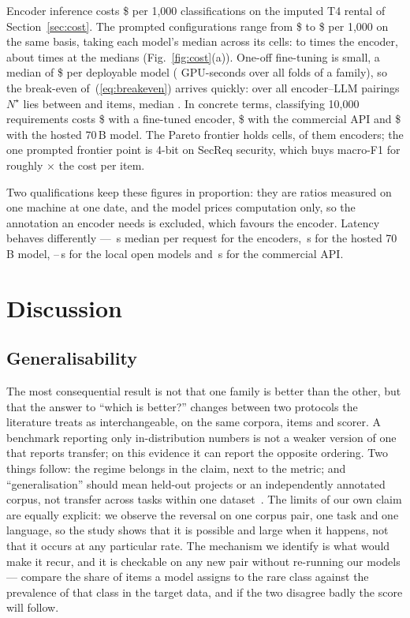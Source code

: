 \documentclass[conference]{IEEEtran}
\newcommand{\Fm}{macro-F1}
\begin{document}
Encoder inference costs \$\nCostEnc{} per 1,000 classifications on the imputed T4
rental of Section~\ref{sec:cost}. The prompted configurations range from
\$\nCostLLMmin{} to \$\nCostLLMmax{} per 1,000 on the same basis, taking each
model's median across its cells: \nRatioMin{} to \nRatioMax{} times the encoder,
about \nRatioMed{} times at the medians (Fig.~\ref{fig:cost}(a)). One-off
fine-tuning is small, a median of \$\nTrainMed{} per deployable model
(\nTrainSec{} GPU-seconds over all folds of a family), so the break-even
of~(\ref{eq:breakeven}) arrives quickly: over all \nNBE{} encoder--LLM pairings
$N^{\star}$ lies between \nBEmin{} and \nBEmax{} items, median \nBEmed{}. In
concrete terms, classifying 10,000 requirements costs \$\nTenkEnc{} with a
fine-tuned encoder, \$\nTenkGem{} with the commercial API and \$\nTenkLla{} with
the hosted 70\,B model. The Pareto frontier holds \nNPareto{} cells,
\nNParetoEnc{} of them encoders; the one prompted frontier point is 4-bit
\nParetoLLM{} on SecReq security, which buys \nParetoGain{} \Fm{} for roughly
\nParetoRatio$\times$ the cost per item.

Two qualifications keep these figures in proportion: they are ratios measured on
one machine at one date, and the model prices computation only, so the annotation
an encoder needs is excluded, which favours the encoder. Latency behaves
differently --- \nLatEnc\,s median per request for the encoders, \nLatHost\,s
for the hosted 70\,B model, \nLatLocMin--\nLatLocMax\,s for the local open
models and \nLatCom\,s for the commercial API.

\section{Discussion}
\subsection{Generalisability}
The most consequential result is not that one family is better than the other,
but that the answer to ``which is better?'' changes between two protocols the
literature treats as interchangeable, on the same corpora, items and scorer. A
benchmark reporting only in-distribution numbers is not a weaker version of one
that reports transfer; on this evidence it can report the opposite ordering. Two
things follow: the regime belongs in the claim, next to the metric; and
``generalisation'' should mean held-out projects or an independently annotated
corpus, not transfer across tasks within one dataset~\cite{binkhonain2025}. The limits of our own claim are equally explicit:
we observe the reversal on one corpus pair, one task and one language, so the
study shows that it is possible and large when it happens, not that it occurs at
any particular rate. The mechanism we identify is what would make it recur, and
it is checkable on any new pair without re-running our models --- compare the
share of items a model assigns to the rare class against the prevalence of that
class in the target data, and if the two disagree badly the score will follow.
\end{document}
